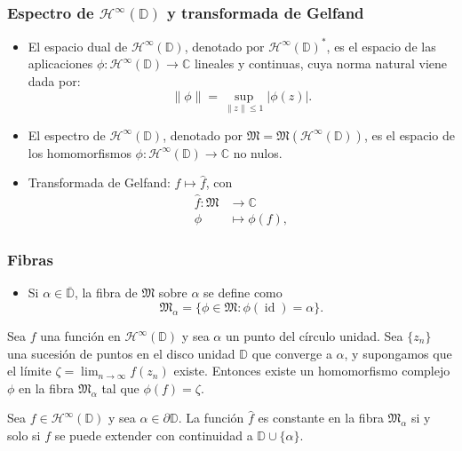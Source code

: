 \documentclass[spanish, a4paper, 12pt, final, slideColor, nototal, colorBG, pdf, noaccumulate, darkblue]{beamer}
\providecommand{\abs}[1]{\left\lvert#1\right\rvert}
\providecommand{\norm}[1]{\left\lVert#1\right\rVert}
\providecommand{\bholomorphic}[1]{\mathcal{H}^{\infty}(#1)}
\newcommand{\complex}{\mathbb{C}}
\newcommand{\disk}{\mathbb{D}}
\newcommand{\closedisk}{\overline{\disk}}
\newcommand{\id}{\operatorname{id}}
\newcommand{\fiber}{\mathfrak{M}}
\begin{document}
\begin{frame}
    \frametitle{Espectro de $\bholomorphic{\disk}$ y transformada de Gelfand}
    \begin{itemize}
        \item El espacio dual de $\bholomorphic{\disk}$, denotado por $\bholomorphic{\disk}^*$, es el espacio de las aplicaciones $\phi: \bholomorphic{\disk} \to \complex$ lineales y continuas, cuya norma natural viene dada por:
            \begin{equation*}
                \norm{\phi} = \sup_{\norm{z} \leq 1} \abs{\phi(z)}.
            \end{equation*}

        \item El espectro de $\bholomorphic{\disk}$, denotado por $\fiber = \fiber (\bholomorphic{\disk})$, es el espacio de los homomorfismos $\phi: \bholomorphic{\disk} \to \complex$ no nulos.

        \item Transformada de Gelfand: $f \mapsto \widehat f$, con
            \begin{equation*}
                \begin{split}
                    \widehat f:  \fiber  & \to  \complex \\
                                 \phi \, & \mapsto  \phi (f),
                \end{split}
            \end{equation*}
    \end{itemize}
\end{frame}

\begin{frame}
    \frametitle{Fibras}
    \begin{itemize}
        \item Si $\alpha \in \closedisk$, la fibra de $\fiber$ sobre $\alpha$ se define como
        \begin{equation*}
            \fiber_\alpha = \{\phi \in \fiber : \phi (\id) = \alpha\}.
        \end{equation*}
    \end{itemize}

    \begin{block}{}
        Sea $f$ una función en $\bholomorphic{\disk}$ y sea $\alpha$ un punto del círculo unidad. Sea $\{z_n\}$ una sucesión de puntos en el disco unidad $\disk$ que converge a $\alpha$, y supongamos que el límite $\zeta = \lim_{n \to \infty} f(z_n)$ existe. Entonces existe un homomorfismo complejo $\phi$ en la fibra $\fiber_\alpha$ tal que $\phi(f) = \zeta$.
    \end{block}

    \begin{block}{}
        Sea $f \in \bholomorphic{\disk}$ y sea $\alpha \in \partial \disk$. La función $\widehat f$ es constante en la fibra $\fiber_\alpha$ si y solo si $f$ se puede extender con continuidad a $\disk \cup \{\alpha\}.$
    \end{block}
\end{frame}
\end{document}
